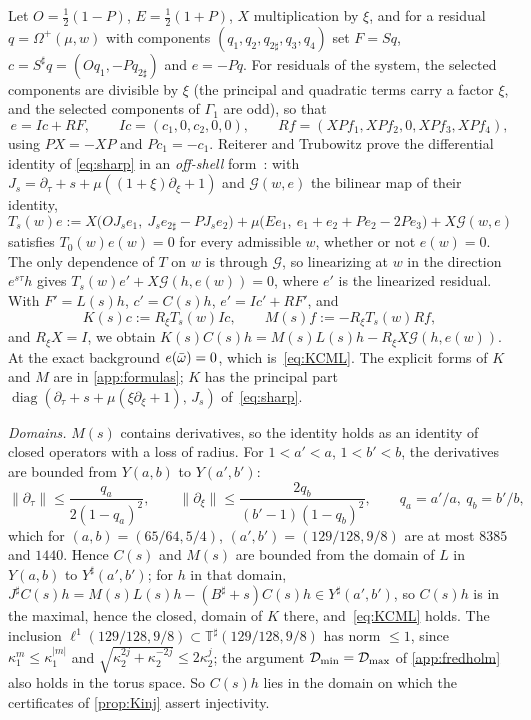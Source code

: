 Let $O=\tfrac12(1-P)$, $E=\tfrac12(1+P)$, $X$ multiplication by $\xi$, and for a residual $q=\Omega^+(\mu,w)$ with
components $(q_1,q_2,q_{2\sharp},q_3,q_4)$ set $F=Sq$, $c=S^\sharp q=(Oq_1,-Pq_{2\sharp})$ and $e=-Pq$. For residuals of
the system, the selected components are divisible by $\xi$ (the principal and quadratic terms carry a factor
$\xi$, and the selected components of $\Gamma_1$ are odd), so that
\[
  e=Ic+RF,\qquad Ic=(c_1,0,c_2,0,0),\qquad Rf=(XPf_1,XPf_2,0,XPf_3,XPf_4),
\]
using $PX=-XP$ and $Pc_1=-c_1$. Reiterer and Trubowitz prove the differential identity of \cref{eq:sharp} in an
\emph{off-shell} form~\cite[\S2]{RT2019}: with $J_s=\partial_\tau+s+\mu((1+\xi)\partial_\xi+1)$ and $\mathcal G(w,e)$
the bilinear map of their identity,
\[
  T_s(w)e:=X\big(OJ_se_1,\ J_se_{2\sharp}-PJ_se_2\big)+\mu\big(Ee_1,\ e_1+e_2+Pe_2-2Pe_3\big)+X\mathcal G(w,e)
\]
satisfies $T_0(w)e(w)=0$ for every admissible $w$, whether or not $e(w)=0$. The only dependence of $T$ on $w$ is
through $\mathcal G$, so linearizing at $w$ in the direction $e^{s\tau}h$ gives $T_s(w)e'+X\mathcal G(h,e(w))=0$,
where $e'$ is the linearized residual. With $F'=L(s)h$, $c'=C(s)h$, $e'=Ic'+RF'$, and
\[
  K(s)c:=R_\xi T_s(w)Ic,\qquad M(s)f:=-R_\xi T_s(w)Rf,
\]
and $R_\xi X=I$, we obtain $K(s)C(s)h=M(s)L(s)h-R_\xi X\mathcal G(h,e(w))$. At the exact background $e(\bar\omega)=0$,
which is~\eqref{eq:KCML}. The explicit forms of $K$ and $M$ are in \cref{app:formulas}; $K$ has the principal part
$\operatorname{diag}(\partial_\tau+s+\mu(\xi\partial_\xi+1),\,J_s)$ of~\eqref{eq:sharp}.

\emph{Domains.} $M(s)$ contains derivatives, so the identity holds as an identity of closed operators with a loss of
radius. For $1<a'<a$, $1<b'<b$, the derivatives are bounded from $Y(a,b)$ to $Y(a',b')$:
\[
  \|\partial_\tau\|\le\frac{q_a}{2(1-q_a)^2},\qquad \|\partial_\xi\|\le\frac{2q_b}{(b'-1)(1-q_b)^2},\qquad
  q_a=a'/a,\ q_b=b'/b,
\]
which for $(a,b)=(65/64,5/4)$, $(a',b')=(129/128,9/8)$ are at most $8385$ and $1440$. Hence $C(s)$ and $M(s)$ are bounded
from the domain of $L$ in $Y(a,b)$ to $Y^\sharp(a',b')$; for $h$ in that domain,
$J^\sharp C(s)h=M(s)L(s)h-(B^\sharp+s)C(s)h\in Y^\sharp(a',b')$, so $C(s)h$ is in the maximal, hence the closed, domain
of $K$ there, and~\eqref{eq:KCML} holds. The inclusion $\ell^1(129/128,9/8)\subset\mathbb T^\sharp(129/128,9/8)$ has norm
$\le1$, since $\kappa_1^m\le\kappa_1^{|m|}$ and $\sqrt{\kappa_2^{2j}+\kappa_2^{-2j}}\le2\kappa_2^j$; the argument $\mathcal{D}_{\min}=\mathcal{D}_{\max}$
of \cref{app:fredholm} also holds in the torus space. So $C(s)h$ lies in the domain on which the certificates of
\cref{prop:Kinj} assert injectivity.

